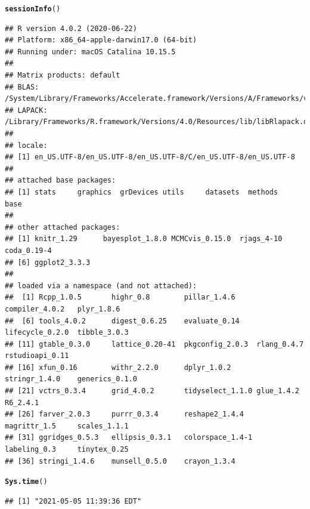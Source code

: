\documentclass{article}\usepackage[]{graphicx}\usepackage[]{color}
\makeatletter
\newcommand{\hlstd}[1]{\textcolor[rgb]{0.345,0.345,0.345}{#1}}%
\newcommand{\hlkwd}[1]{\textcolor[rgb]{0.737,0.353,0.396}{\textbf{#1}}}%
\newenvironment{kframe}{%
 \def\at@end@of@kframe{}%
 \ifinner\ifhmode%
  \def\at@end@of@kframe{\end{minipage}}%
  \begin{minipage}{\columnwidth}%
 \fi\fi%
 \def\FrameCommand##1{\hskip\@totalleftmargin \hskip-\fboxsep
 \colorbox{shadecolor}{##1}\hskip-\fboxsep
     \hskip-\linewidth \hskip-\@totalleftmargin \hskip\columnwidth}%
 \MakeFramed {\advance\hsize-\width
   \@totalleftmargin\z@ \linewidth\hsize
   \@setminipage}}%
 {\par\unskip\endMakeFramed%
 \at@end@of@kframe}
\newenvironment{knitrout}{}{} %
\makeatother
\begin{document}
\begin{knitrout}
\color{fgcolor}\begin{kframe}
\begin{alltt}
\hlkwd{sessionInfo}\hlstd{()}
\end{alltt}
\begin{verbatim}
## R version 4.0.2 (2020-06-22)
## Platform: x86_64-apple-darwin17.0 (64-bit)
## Running under: macOS Catalina 10.15.5
## 
## Matrix products: default
## BLAS:   /System/Library/Frameworks/Accelerate.framework/Versions/A/Frameworks/vecLib.framework/Versions/A/libBLAS.dylib
## LAPACK: /Library/Frameworks/R.framework/Versions/4.0/Resources/lib/libRlapack.dylib
## 
## locale:
## [1] en_US.UTF-8/en_US.UTF-8/en_US.UTF-8/C/en_US.UTF-8/en_US.UTF-8
## 
## attached base packages:
## [1] stats     graphics  grDevices utils     datasets  methods   base     
## 
## other attached packages:
## [1] knitr_1.29      bayesplot_1.8.0 MCMCvis_0.15.0  rjags_4-10      coda_0.19-4    
## [6] ggplot2_3.3.3  
## 
## loaded via a namespace (and not attached):
##  [1] Rcpp_1.0.5       highr_0.8        pillar_1.4.6     compiler_4.0.2   plyr_1.8.6      
##  [6] tools_4.0.2      digest_0.6.25    evaluate_0.14    lifecycle_0.2.0  tibble_3.0.3    
## [11] gtable_0.3.0     lattice_0.20-41  pkgconfig_2.0.3  rlang_0.4.7      rstudioapi_0.11 
## [16] xfun_0.16        withr_2.2.0      dplyr_1.0.2      stringr_1.4.0    generics_0.1.0  
## [21] vctrs_0.3.4      grid_4.0.2       tidyselect_1.1.0 glue_1.4.2       R6_2.4.1        
## [26] farver_2.0.3     purrr_0.3.4      reshape2_1.4.4   magrittr_1.5     scales_1.1.1    
## [31] ggridges_0.5.3   ellipsis_0.3.1   colorspace_1.4-1 labeling_0.3     tinytex_0.25    
## [36] stringi_1.4.6    munsell_0.5.0    crayon_1.3.4
\end{verbatim}
\begin{alltt}
\hlkwd{Sys.time}\hlstd{()}
\end{alltt}
\begin{verbatim}
## [1] "2021-05-05 11:39:36 EDT"
\end{verbatim}
\end{kframe}
\end{knitrout}
\end{document}
